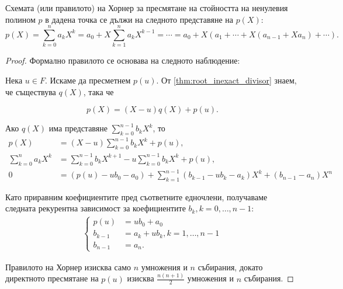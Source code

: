 \documentclass[
  headings=standardclasses,
  bibliography=totocnumbered,
]{scrartcl}
\begin{document}
\begin{proposition}
  Схемата (или правилото) на Хорнер за пресмятане на стойността на ненулевия полином \( p \) в дадена точка се дължи на следното представяне на \( p(X) \):
  \begin{equation*}
    p(X) = \sum_{k=0}^n a_k X^k = a_0 + X \sum_{k=1}^n a_k X^{k-1} = \cdots = a_0 + X (a_1 + \cdots + X(a_{n-1} + X a_n) + \cdots).
  \end{equation*}
\end{proposition}
\begin{proof}
  Формално правилото се основава на следното наблюдение:

  Нека \( u \in F \). Искаме да пресметнем \( p(u) \). От \cref{thm:root_inexact_divisor} знаем, че съществува \( q(X) \), така че

  \begin{equation*}
    p(X) = (X - u) q(X) + p(u).
  \end{equation*}

  Ако \( q(X) \) има представяне \( \sum_{k=0}^{n-1} b_k X^k \), то
  \begin{align*}
    p(X)
    &=
    (X - u) \sum_{k=0}^{n-1} b_k X^k + p(u),
    \\
    \sum_{k=0}^n a_k X^k
    &=
    \sum_{k=0}^{n-1} b_k X^{k+1} - u \sum_{k=0}^{n-1} b_k X^k + p(u),
    \\
    0
    &=
    (p(u) - u b_0 - a_0) + \sum_{k=1}^{n-1} (b_{k-1} - u b_k - a_k) X^k + (b_{n-1} - a_n) X^n
  \end{align*}

  Като приравним коефициентите пред съответните едночлени, получаваме следната рекурентна зависимост за коефициентите \( b_k, k = 0, \ldots, n - 1 \):
  \begin{align*}
    \begin{cases}
      p(u) &= u b_0 + a_0 \\
      b_{k-1} &= a_k + u b_k, k = 1, \ldots, n - 1 \\
      b_{n-1} &= a_n.
    \end{cases}
  \end{align*}

  Правилото на Хорнер изисква само \( n \) умножения и \( n \) събирания, докато директното пресмятане на \( p(u) \) изисква \( \frac {n(n+1)} 2 \) умножения и \( n \) събирания.
\end{proof}
\end{document}
